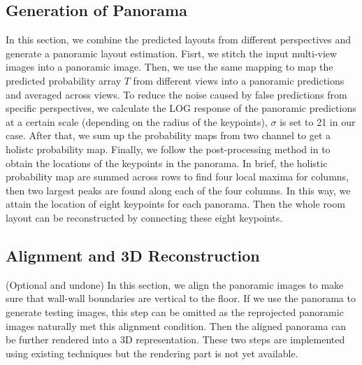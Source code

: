 

\subsection{Generation of Panorama}
\label{sec:merging}
In this section, we combine the predicted layouts from different perspectives and generate a panoramic layout estimation. Fisrt, we stitch the input multi-view images into a panoramic image. Then, we use the same mapping to map the predicted probability array $T$ from different views into a panoramic predictions and averaged across views. To reduce the noise caused by false predictions from specific perspectives, we calculate the LOG response of the panoramic predictions at a certain scale (depending on the radius of the keypoints), $\sigma$ is set to 21 in our case. After that, we sum up the probability maps from two channel to get a holistc probability map. Finally, we follow the post-processing method in \cite{LayoutNet} to obtain the locations of the keypoints in the panorama. In brief, the holistic probability map are summed across rows to find four local maxima for columns, then two largest peaks are found along each of the four columns. In this way, we attain the location of eight keypoints for each panorama. Then the whole room layout can be reconstructed by connecting these eight keypoints. 


\subsection{Alignment and 3D Reconstruction}
\label{sec:align}

(Optional and undone) In this section, we align the panoramic images to make sure that wall-wall boundaries are vertical to the floor. If we use the panorama to generate testing images, this step can be omitted as the reprojected panoramic images naturally met this alignment condition. Then the aligned panorama can be further rendered into a 3D representation. These two steps are implemented using existing techniques but the rendering part is not yet available. 
